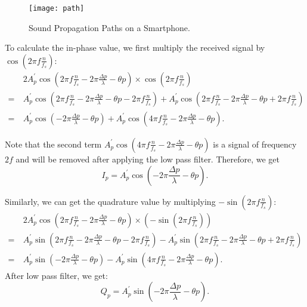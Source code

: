 \begin{figure}[h]
	\centering
	\texttt{[image: path]}
	\caption{Sound Propagation Paths on a Smartphone.}
	\label{fig:soundpath}
\end{figure}

To calculate the in-phase value, we first multiply the received signal by $\cos \left (2\pi f \frac{n}{f_s}\right)$:
\begin{align*}
&2A^\prime_p \cos \left (2\pi f \frac{n}{f_s}  - 2 \pi \frac{\Delta p}{\lambda} - \theta p\right) \times \cos \left (2\pi f \frac{n}{f_s}\right)\\        
=~&A^\prime_p \cos \left (2\pi f \frac{n}{f_s}  - 2 \pi \frac{\Delta p}{\lambda} - \theta p - 2\pi f \frac{n}{f_s}\right)  + A^\prime_p \cos \left (2\pi f \frac{n}{f_s}  - 2 \pi \frac{\Delta p}{\lambda} - \theta p + 2\pi f \frac{n}{f_s}\right)  \\
=~&A^\prime_p \cos \left( - 2 \pi \frac{\Delta p}{\lambda} - \theta p \right)  + A^\prime_p \cos (4\pi f \frac{n}{f_s}  - 2 \pi \frac{\Delta p}{\lambda} - \theta p )  .
\end{align*}

Note that the second term $A^\prime_p \cos \left(4\pi f \frac{n}{f_s}  - 2 \pi \frac{\Delta p}{\lambda} - \theta p \right) $ is a signal of frequency $2f$ and will be removed after applying the low pass filter. Therefore, we get 
\begin{displaymath}
I_p = A^\prime_p \cos \left( - 2 \pi \frac{\Delta p}{\lambda} - \theta p \right) .
\end{displaymath}

Similarly, we can get the quadrature value by multiplying $-\sin \left (2\pi f \frac{n}{f_s}\right)$:
\begin{align*}
&2A^\prime_p \cos \left (2\pi f \frac{n}{f_s}  - 2 \pi \frac{\Delta p}{\lambda} - \theta p\right) \times \left(- \sin \left (2\pi f \frac{n}{f_s}\right)\right)\\        
=~&A^\prime_p \sin \left (2\pi f \frac{n}{f_s}  - 2 \pi \frac{\Delta p}{\lambda} - \theta p - 2\pi f \frac{n}{f_s}\right)  - A^\prime_p \sin \left (2\pi f \frac{n}{f_s}  - 2 \pi \frac{\Delta p}{\lambda} - \theta p + 2\pi f \frac{n}{f_s}\right)  \\
=~&A^\prime_p \sin \left( - 2 \pi \frac{\Delta p}{\lambda} - \theta p \right)  -  A^\prime_p \sin \left(4\pi f \frac{n}{f_s}  - 2 \pi \frac{\Delta p}{\lambda} - \theta p \right)   .
\end{align*}
After low pass filter, we get:
\begin{displaymath}
Q_p = A^\prime_p \sin \left( - 2 \pi \frac{\Delta p}{\lambda} - \theta p \right) .
\end{displaymath}


